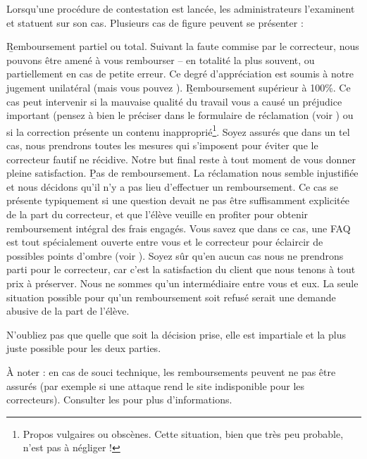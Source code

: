 ﻿Lorsqu'une procédure de contestation est lancée, les administrateurs l'examinent et statuent sur son cas. Plusieurs cas de figure peuvent se présenter :

\begin{itemize}
\li \b{Remboursement partiel ou total.} Suivant la faute commise par le correcteur, nous pouvons être amené à vous rembourser -- en totalité la plus souvent, ou partiellement en cas de petite erreur. Ce degré d'appréciation est soumis à notre jugement unilatéral (mais vous pouvez ).
\li \b{Remboursement supérieur à 100\%.} Ce cas peut intervenir si la mauvaise qualité du travail vous a causé un préjudice important (pensez à bien le préciser dans le formulaire de réclamation (voir ) ou si la correction présente un contenu inapproprié\footnote{Propos vulgaires ou obscènes. Cette situation, bien que très peu probable, n'est pas à négliger !}. Soyez assurés que dans un tel cas, nous prendrons toutes les mesures qui s'imposent pour éviter que le correcteur fautif ne récidive. Notre but final reste à tout moment de vous donner pleine satisfaction.
\li \b{Pas de remboursement.} La réclamation nous semble injustifiée et nous décidons qu'il n'y a pas lieu d'effectuer un remboursement. Ce cas se présente typiquement si une question devait ne pas être suffisamment explicitée de la part du correcteur, et que l'élève veuille en profiter pour obtenir remboursement intégral des frais engagés. Vous savez que dans ce cas, une FAQ est tout spécialement ouverte entre vous et le correcteur pour éclaircir de possibles points d'ombre (voir ). Soyez sûr qu'en aucun cas nous ne prendrons parti pour le correcteur, car c'est la satisfaction du client que nous tenons à tout prix à préserver. Nous ne sommes qu'un intermédiaire entre vous et eux. La seule situation possible pour qu'un remboursement soit refusé serait une demande abusive de la part de l'élève.
\end{itemize}

N'oubliez pas que quelle que soit la décision prise, elle est impartiale et la plus juste possible pour les deux parties.

À noter : en cas de souci technique, les remboursements peuvent ne pas être assurés (par exemple si une attaque rend le site indisponible pour les correcteurs). Consulter les  pour plus d'informations.